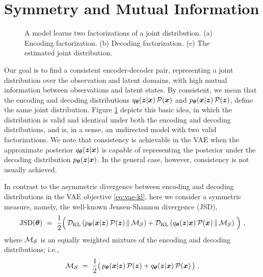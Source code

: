
\section{Symmetry and Mutual Information}
\label{sec:symmetry_and_mutual_information}

\begin{figure}
    \centering
    
    \caption{A \MIM model learns two factorizations of a joint distribution.
    (a) Encoding factorization. (b) Decoding factorization.
    (c) The estimated joint distribution.
    }
    \label{fig:mim-model}
\end{figure}

Our goal is to find a consistent encoder-decoder pair, representing a joint
distribution over the observation and latent domains, with high mutual
information between observations and latent states. By consistent, we mean 
that the encoding and decoding distributions $q_{{\boldsymbol \theta}}({\boldsymbol z} | {\boldsymbol{x}})\, \mathcal{P}({\boldsymbol{x}})$ 
and $p_{{\boldsymbol \theta}}({\boldsymbol{x}} | {\boldsymbol z})\, \mathcal{P}({\boldsymbol z})$, define the same joint distribution.
Figure \ref{fig:mim-model} depicts this basic idea, in which the distribution is
valid and identical under both the encoding and decoding distributions, and is, in a
sense, an undirected model with two valid factorizations.  We note that consistency 
is achievable in the VAE when the approximate posterior $q_{{\boldsymbol \theta}}({\boldsymbol z} | {\boldsymbol{x}})$ is capable 
of representing the posterior under the decoding distribution $p_{{\boldsymbol \theta}}({\boldsymbol z} | {\boldsymbol{x}})$.
In the general case, however, consistency is not usually achieved.

In contrast to the asymmetric divergence between encoding and decoding
distributions in the VAE objective \eqref{eq:vae-kl}, here we consider a
symmetric measure, namely, the well-known Jensen-Shannon divergence (JSD),
\begin{equation}
    \mathrm{JSD}({\boldsymbol \theta}) ~=~
    \frac{1}{2}\Big( \, \mathcal{D}_\text{KL}\left(p_{{\boldsymbol \theta}}({\boldsymbol{x}} | {\boldsymbol z})\, \mathcal{P}({\boldsymbol z})\,\|\, \mathcal{M}_{\mathcal{S}}\right) + \mathcal{D}_\text{KL}\left(q_{{\boldsymbol \theta}}({\boldsymbol z} | {\boldsymbol{x}})\, \mathcal{P}({\boldsymbol{x}})\,\|\, \mathcal{M}_{\mathcal{S}}\right)\, \Big) ~,
\end{equation}
where $\mathcal{M}_{\mathcal{S}}$ is an equally weighted mixture of the encoding
and decoding distributions; i.e.,
\begin{equation}
   \mathcal{M}_{\mathcal{S}} ~=~ \frac{1}{2} \big( \,p_{{\boldsymbol \theta}}({\boldsymbol{x}} | {\boldsymbol z})\, \mathcal{P}({\boldsymbol z}) + q_{{\boldsymbol \theta}}({\boldsymbol z} | {\boldsymbol{x}})\, \mathcal{P}({\boldsymbol{x}}) \, \big)  ~.
   \label{eqn:msamp}
\end{equation}

